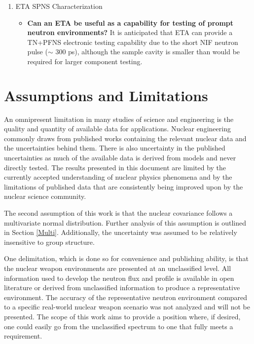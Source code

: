 \begin{enumerate}
\begin{itemize}
    \end{itemize}
	\item ETA SPNS Characterization 
	\begin{itemize}
		\item \textbf{Can an ETA be useful as a capability for testing of prompt neutron environments?} 
		It is anticipated that ETA can provide a TN+PFNS electronic testing capability due to the short NIF neutron pulse ($\sim$ 300 ps), although the sample cavity is smaller than would be required for larger component testing. 
	\end{itemize}
\end{enumerate}

\section{Assumptions and Limitations}

An omnipresent limitation in many studies of science and engineering is the quality and quantity of available data for applications. 
Nuclear engineering commonly draws from published works containing the relevant nuclear data and the uncertainties behind them. 
There is also uncertainty in the published uncertainties as much of the available data is derived from models and never directly tested. 
The results presented in this document are limited by the currently accepted understanding of nuclear physics phenomena and by the limitations of published data that are consistently being improved upon by the nuclear science community. 

The second assumption of this work is that the nuclear covariance follows a multivariate normal distribution. Further analysis of this assumption is outlined in Section \ref{Multi}. 
Additionally, the uncertainty was assumed to be relatively insensitive to group structure. 

One delimitation, which is done so for convenience and publishing ability, is that the nuclear weapon environments are presented at an unclassified level. 
All information used to develop the neutron flux and profile is available in open literature or derived from unclassified information to produce a representative environment. 
The accuracy of the representative neutron environment compared to a specific real-world nuclear weapon scenario was not analyzed and will not be presented. 
The scope of this work aims to provide a position where, if desired, one could easily go from the unclassified spectrum to one that fully meets a requirement. 

